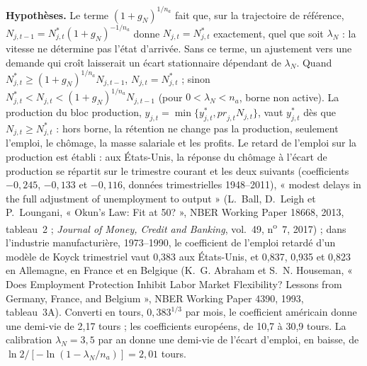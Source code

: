\documentclass[11pt,a4paper]{article}
\newcommand{\hyp}{\par\noindent\textbf{Hypothèses.} }
\begin{document}
\begin{lecture}
\hyp Le terme $(1 + g_N)^{1/n_a}$ fait que, sur la trajectoire de référence, $N_{j,t-1} = N^{\ast}_{j,t}(1 + g_N)^{-1/n_a}$ donne $N_{j,t} = N^{\ast}_{j,t}$ exactement, quel que soit $\lambda_N$ : la vitesse ne détermine pas l'état d'arrivée. Sans ce terme, un ajustement vers une demande qui croît laisserait un écart stationnaire dépendant de $\lambda_N$. Quand $N^{\ast}_{j,t} \ge (1 + g_N)^{1/n_a} N_{j,t-1}$, $N_{j,t} = N^{\ast}_{j,t}$ ; sinon $N^{\ast}_{j,t} < N_{j,t} < (1 + g_N)^{1/n_a} N_{j,t-1}$ (pour $0 < \lambda_N < n_a$, borne non active). La production du bloc production, $y_{j,t} = \min\{y^{\ast}_{j,t}, \mathit{pr}_{j,t} N_{j,t}\}$, vaut $y^{\ast}_{j,t}$ dès que $N_{j,t} \ge N^{\ast}_{j,t}$ : hors borne, la rétention ne change pas la production, seulement l'emploi, le chômage, la masse salariale et les profits. Le retard de l'emploi sur la production est établi : aux États-Unis, la réponse du chômage à l'écart de production se répartit sur le trimestre courant et les deux suivants (coefficients $-0{,}245$, $-0{,}133$ et $-0{,}116$, données trimestrielles 1948--2011), « modest delays in the full adjustment of unemployment to output » (L.~Ball, D.~Leigh et P.~Loungani, « Okun's Law: Fit at 50? », NBER Working Paper 18668, 2013, tableau~2 ; \emph{Journal of Money, Credit and Banking}, vol.~49, n\textsuperscript{o}~7, 2017) ; dans l'industrie manufacturière, 1973--1990, le coefficient de l'emploi retardé d'un modèle de Koyck trimestriel vaut 0,383 aux États-Unis, et 0,837, 0,935 et 0,823 en Allemagne, en France et en Belgique (K.~G. Abraham et S.~N. Houseman, « Does Employment Protection Inhibit Labor Market Flexibility? Lessons from Germany, France, and Belgium », NBER Working Paper 4390, 1993, tableau~3A). Converti en tours, $0{,}383^{1/3}$ par mois, le coefficient américain donne une demi-vie de 2,17 tours ; les coefficients européens, de 10,7 à 30,9 tours. La calibration $\lambda_N = 3{,}5$ par an donne une demi-vie de l'écart d'emploi, en baisse, de $\ln 2/[-\ln(1 - \lambda_N/n_a)] = 2{,}01$ tours.

\end{lecture}
\end{document}
